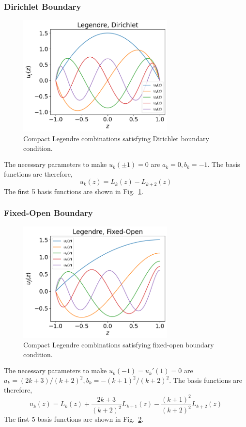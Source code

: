 \subsubsection*{Dirichlet Boundary}
\begin{figure} [htbp]
	\centering
	\includegraphics[width=0.7\textwidth]{figures/legendre-dirichlet.png}
	\caption{Compact Legendre combinations satisfying Dirichlet boundary condition.}
	\label{fig:legendre-dirichlet}
\end{figure}
The necessary parameters to make $u_k(\pm 1) = 0$ are $a_k=0, b_k=-1$. The basis functions are therefore,
\begin{equation}
	u_k(z) = L_k(z) - L_{k+2}(z)
\end{equation}
The first 5 basis functions are shown in Fig.~\ref{fig:legendre-dirichlet}.

\subsubsection*{Fixed-Open Boundary}
\begin{figure} [htbp]
	\centering
	\includegraphics[width=0.7\textwidth]{figures/legendre-fixed-open.png}
	\caption{Compact Legendre combinations satisfying fixed-open boundary condition.}
	\label{fig:legendre-fixed-open}
\end{figure}
The necessary parameters to make $u_k(-1)=u_k'(1)=0$ are $a_k=(2k+3)/(k+2)^2, b_k=-(k+1)^2/(k+2)^2$. The basis functions are therefore,
\begin{equation}
	u_k(z) = L_k(z) + \frac{2k+3}{(k+2)^2}L_{k+1}(z) - \frac{(k+1)^2}{(k+2)^2}L_{k+2}(z)
\end{equation}
The first 5 basis functions are shown in Fig.~\ref{fig:legendre-fixed-open}.

